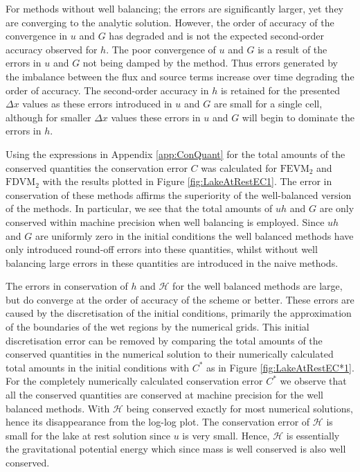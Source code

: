 For methods without well balancing; the errors are significantly larger, yet they are converging to the analytic solution. However, the order of accuracy of the convergence in $u$ and $G$ has degraded and is not the expected second-order accuracy observed for $h$. The poor convergence of $u$ and $G$ is a result of the errors in $u$ and $G$ not being damped by the method. Thus errors generated by the imbalance between the flux and source terms increase over time degrading the order of accuracy. The second-order accuracy in $h$ is retained for the presented $\Delta x$ values as these errors introduced in $u$ and $G$ are small for a single cell, although for smaller $\Delta x$ values these errors in $u$ and $G$ will begin to dominate the errors in $h$. 


Using the expressions in Appendix \ref{app:ConQuant} for the total amounts of the conserved quantities the conservation error $C$ was calculated for $\text{FEVM}_2$ and $\text{FDVM}_2$ with the results plotted in Figure \ref{fig:LakeAtRestEC1}. The error in conservation of these methods affirms the superiority of the well-balanced version of the methods. In particular, we see that the total amounts of $uh$ and $G$ are only conserved within machine precision when well balancing is employed. Since $uh$ and $G$ are uniformly zero in the initial conditions the well balanced methods have only introduced round-off errors into these quantities, whilst without well balancing large errors in these quantities are introduced in the naive methods. 

The errors in conservation of $h$ and $\mathcal{H}$ for the well balanced methods are large, but do converge at the order of accuracy of the scheme or better. These errors are caused by the discretisation of the initial conditions, primarily the approximation of the boundaries of the wet regions by the numerical grids. This initial discretisation error can be removed by comparing the total amounts of the conserved quantities in the numerical solution to their numerically calculated total amounts in the initial conditions with $C^*$ as in Figure \ref{fig:LakeAtRestEC*1}. For the completely numerically calculated conservation error $C^*$ we observe that all the conserved quantities are conserved at machine precision for the well balanced methods. With $\mathcal{H}$ being conserved exactly for most numerical solutions, hence its disappearance from the log-log plot. The conservation error of $\mathcal{H}$ is small for the lake at rest solution since $u$ is very small. Hence, $\mathcal{H}$ is essentially the gravitational potential energy which since mass is well conserved is also well conserved.

